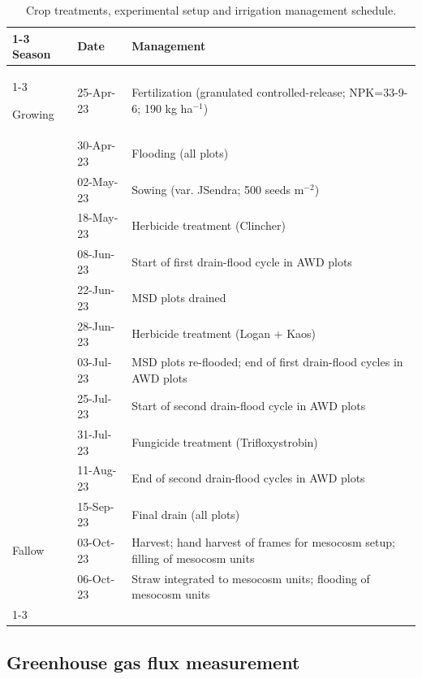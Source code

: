 \begin{table} [htbp]
    \centering
    \footnotesize  
    \begin{tabular}{ l  l  l }
\cline{1-3}
{Season} & {Date} & {Management} \\
\cline{1-3}
\rule{0pt}{3ex} %
{Growing} & {25-Apr-23} & {Fertilization (granulated controlled-release; NPK=33-9-6; 190 kg ha$^{-1}$)} \\
{} & {30-Apr-23} & {Flooding (all plots)} \\
{} & {02-May-23} & {Sowing (var. JSendra; 500 seeds m$^{-2}$)} \\
{} & {18-May-23} & {Herbicide treatment (Clincher)} \\
{} & {08-Jun-23} & {Start of first drain-flood cycle in  AWD plots} \\
{} & {22-Jun-23} & {MSD plots drained} \\
{} & {28-Jun-23} & {Herbicide treatment (Logan + Kaos)} \\
{} & {03-Jul-23} & {MSD plots re-flooded; end of first drain-flood cycles in  AWD plots} \\
{} & {25-Jul-23} & {Start of second drain-flood cycle in  AWD plots} \\
{} & {31-Jul-23} & {Fungicide treatment (Trifloxystrobin)} \\
{} & {11-Aug-23} & {End of second drain-flood cycles in  AWD plots} \\
{} & {15-Sep-23} & {Final drain (all plots)} \\
\rule{0pt}{3ex}
{Fallow} & {03-Oct-23} & {Harvest; hand harvest of frames for mesocosm setup; filling of mesocosm units} \\
{} & {06-Oct-23} & {Straw integrated to mesocosm units; flooding of mesocosm units}\\
\cline{1-3}
    \end{tabular}
    \caption[Crop treatments, setup and irrigation schedule]{Crop treatments, experimental setup and irrigation management schedule.}
    \label{field_mgmt2}
\end{table} 

\subsection{Greenhouse gas flux measurement}
\label{sec:meth_GHG2} 

